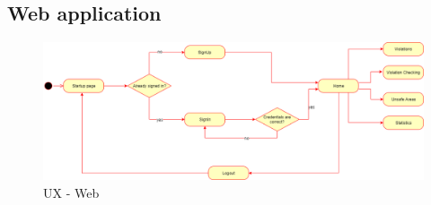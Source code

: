         \subsection{Web application}
        \begin{figure}[H]
            \includegraphics[scale = 0.35]{dd/resources/images/UX-diagram-web.png}
            \caption{UX - Web}        
        \end{figure}      